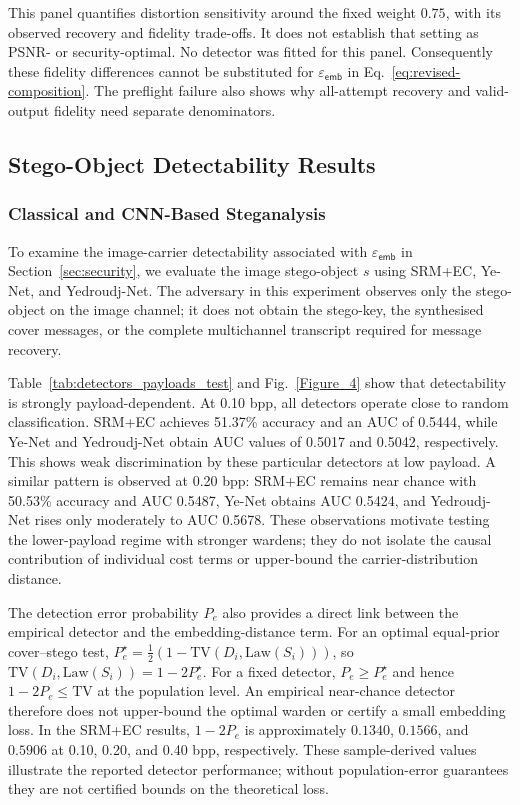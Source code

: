 \documentclass[pdflatex,sn-mathphys-num]{sn-jnl}%
\theoremstyle{definition}
\theoremstyle{game}
\theoremstyle{thmstyleone}%
\theoremstyle{thmstyletwo}%
\theoremstyle{thmstylethree}%
\begin{document}
This panel quantifies distortion sensitivity around the fixed weight
$0.75$, with its observed recovery and fidelity trade-offs. It does not
establish that setting as PSNR- or security-optimal.
No detector was fitted for this panel. Consequently these fidelity
differences cannot be substituted for $\varepsilon_{\mathsf{emb}}$ in
Eq.~\eqref{eq:revised-composition}. The preflight failure also shows why
all-attempt recovery and valid-output fidelity need separate denominators.

\subsection{Stego-Object Detectability Results}
\label{subsec:detectability_results}
\subsubsection{Classical and CNN-Based Steganalysis}
\label{subsec:classical-cnn}

To examine the image-carrier detectability associated with
$\varepsilon_{\mathsf{emb}}$ in Section~\ref{sec:security}, we evaluate the image stego-object $s$
using SRM+EC, Ye-Net, and Yedroudj-Net. The adversary in this
experiment observes only the stego-object on the image channel; it
does not obtain the stego-key, the synthesised cover messages, or the
complete multichannel transcript required for message recovery.

Table~\ref{tab:detectors_payloads_test} and
Fig.~\ref{Figure_4} show that detectability is strongly
payload-dependent. At 0.10 bpp, all detectors operate close to random
classification. SRM+EC achieves 51.37\% accuracy and an AUC of
0.5444, while Ye-Net and Yedroudj-Net obtain AUC values of 0.5017
and 0.5042, respectively. This shows weak discrimination by these particular detectors at low payload. A similar pattern is observed at 0.20 bpp:
SRM+EC remains near chance with 50.53\% accuracy and AUC 0.5487,
Ye-Net obtains AUC 0.5424, and Yedroudj-Net rises only moderately
to AUC 0.5678. These observations motivate testing the lower-payload regime with stronger
wardens; they do not isolate the causal contribution of individual cost terms
or upper-bound the carrier-distribution distance.

The detection error probability $P_e$ also provides a direct link
between the empirical detector and the embedding-distance term. For an
optimal equal-prior cover--stego test, $P_e^\star=\frac{1}{2}(1-\mathrm{TV}(D_i,\mathrm{Law}(S_i)))$, so $\mathrm{TV}(D_i,\mathrm{Law}(S_i))=1-2P_e^\star$.
For a fixed detector, $P_e\ge P_e^\star$ and hence $1-2P_e\le\mathrm{TV}$ at the population level. An empirical near-chance detector therefore does not upper-bound the optimal warden or certify a small embedding loss. In the SRM+EC results,
$1-2P_e$ is approximately $0.1340$, $0.1566$, and $0.5906$ at
0.10, 0.20, and 0.40 bpp, respectively. These sample-derived values illustrate the reported detector
performance; without population-error guarantees they are not certified
bounds on the theoretical loss.
\end{document}
